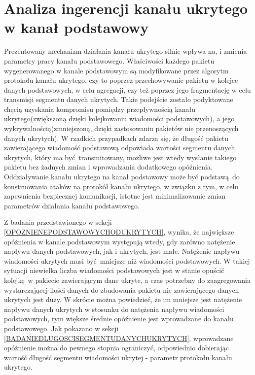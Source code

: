 \documentclass[a4paper, twoside, 12pt]{report}
\begin{document}
    \section{Analiza ingerencji kanału ukrytego w kanał podstawowy}
        Prezentowany mechanizm działania kanału ukrytego silnie wpływa na, i zmienia
        parametry pracy kanału podstawowego. Właściwości każdego pakietu wygenerowanego
        w kanale podstawowym są modyfikowane przez algorytm protokołu kanału ukrytego,
        czy to poprzez przechowywanie pakietu w kolejce danych podstawowych, w celu
        agregacji, czy też
        poprzez jego fragmentację w celu transmisji segmentu danych ukrytych. Takie podejście
        zostało podyktowane chęcią uzyskania kompromisu pomiędzy przepływnością
        kanału ukrytego(zwiększoną dzięki kolejkowaniu wiadomości podstawowych),
        a jego wykrywalnością(zmniejszoną, dzięki zastosowaniu pakietów nie przenoszących danych ukrytych).
        W rzadkich
        przypadkach zdarza się, że długość pakietu zawierającego wiadomość podstawową
        odpowiada wartości segmentu danych ukrytych, który ma być transmitowany,
        możliwe jest wtedy wysłanie takiego pakietu bez żadnych zmian i wprowadzania
        dodatkowego opóźnienia. Oddziaływanie kanału ukrytego na kanał podstawowy
        może być podstawą do konstruowania ataków na protokół kanału ukrytego, w
        związku z tym, w celu zapewnienia bezpiecznej komunikacji, istotne jest
        minimalizowanie zmian parametrów działania kanału podstawowego.

        Z badania przedstawionego w sekcji \ref{OPOZNIENEPODSTAWOWYCHODUKRYTYCH},
        wynika, że największe opóźnienia w kanale podstawowym
        występują wtedy, gdy zarówno natężenie napływu danych podstawowych, jak i ukrytych, jest małe.
        Natężenie napływu wiadomości ukrytych musi być mniejsze niż wiadomości podstawowych.
        W takiej sytuacji niewielka liczba wiadomości podstawowych jest w stanie
        opuścić kolejkę w pakiecie zawierającym dane ukryte, a czas potrzebny do
        zaagregowania wystarczającej ilości danych do zbudowania pakietu nie
        zawierającego danych ukrytych jest duży. W skrócie można powiedzieć, że
        im mniejsze jest natężenie napływu danych ukrytych w stosunku do natężenia
        napływu wiadomości podstawowych, tym większe średnie opóźnienie jest wprowadzane
        do kanału podstawowego. Jak pokazano w sekcji \ref{BADANIEDLUGOSCISEGMENTUDANYCHUKRYTYCH},
        wprowadzane opóźnienie można do pewnego stopnia ograniczyć, odpowiednio
        dobierając wartość długość segmentu wiadomości ukrytej - parametr protokołu
        kanału ukrytego.
\end{document}
